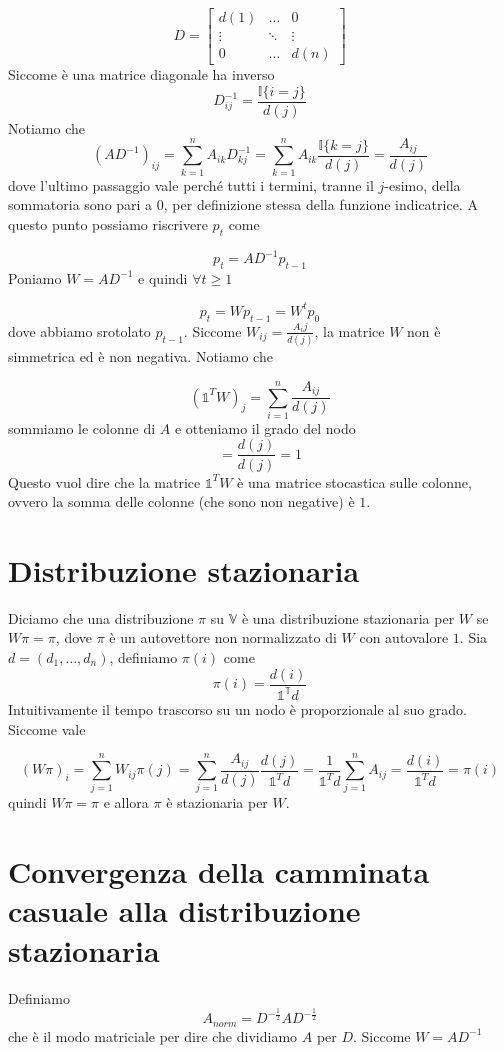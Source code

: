 \documentclass[12pt]{report}
\begin{document}
\[
    D = \begin{bmatrix}
        d(1) & \dots & 0 \\
        \vdots & \ddots & \vdots \\
        0 & \dots & d(n)
    \end{bmatrix}
\]
Siccome è una matrice diagonale ha inverso
$$D_{ij}^{-1} = \frac{\mathds{I}\{i = j\}}{d(j)}$$
Notiamo che
$$(AD^{-1})_{ij} = \sum_{k = 1}^n A_{ik} D_{kj}^{-1} = \sum_{k=1}^n A_{ik} \frac{\mathds{I}\{k = j\}}{d(j)} = \frac{A_{ij}}{d(j)}$$
dove l'ultimo passaggio vale perché tutti i termini, tranne il $j$-esimo, della sommatoria sono pari a $0$, per definizione stessa della funzione indicatrice.
A questo punto possiamo riscrivere $p_t$ come

$$p_t = AD^{-1} p_{t-1}$$
Poniamo $W = AD^{-1}$ e quindi $\forall t \geq 1$

$$p_t = W p_{t-1} = W^t p_0$$
dove abbiamo srotolato $p_{t-1}$. Siccome $W_{ij} = \frac{A_ij}{d(j)}$, la matrice $W$ non è simmetrica ed è non negativa. Notiamo che

$$(\mathds{1}^T W)_j = \sum_{i = 1}^n \frac{A_{ij}}{d(j)} $$
sommiamo le colonne di $A$ e otteniamo il grado del nodo
$$= \frac{d(j)}{d(j)} = 1$$
Questo vuol dire che la matrice $\mathds{1}^T W$ è una matrice stocastica sulle colonne, ovvero la somma delle colonne (che sono non negative) è $1$. 

\section{Distribuzione stazionaria}

Diciamo che una distribuzione $\pi$ su $\mathds{V}$ è una distribuzione stazionaria per $W$ se $W \pi = \pi$, dove $\pi$ è un autovettore non normalizzato di $W$ con autovalore $1$. Sia $d = (d_1,\dots, d_n)$, definiamo $\pi(i)$ come 
$$\pi(i) = \frac{d(i)}{\mathds{1^T}d}$$
Intuitivamente il tempo trascorso su un nodo è proporzionale al suo grado. Siccome vale

$$(W\pi)_i = \sum_{j = 1}^n W_{ij} \pi(j) = \sum_{j=1}^n \frac{A_{ij}}{d(j)} \frac{d(j)}{\mathds{1}^T d} = \frac{1}{\mathds{1}^T d} \sum_{j = 1}^n A_{ij} = \frac{d(i)}{\mathds{1}^T d} = \pi(i)$$
quindi $W \pi = \pi$ e allora $\pi$ è stazionaria per $W$. 
\section{Convergenza della camminata casuale alla distribuzione stazionaria}
Definiamo 
$$A_{norm} = D^{-\frac{1}{2}} A D^{-\frac{1}{2}}$$
che è il modo matriciale per dire che dividiamo $A$ per $D$. Siccome $W = A D^{-1}$
\end{document}
